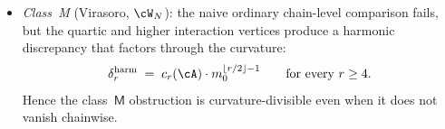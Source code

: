 \begin{proposition}
\begin{enumerate}[label=\textup{(\arabic*)},nosep]
\begin{itemize}[nosep]
 \textup{(}$\beta\gamma$\textup{)}:
 conditional on harmonic decoupling.
 Although the quartic interaction vertex is nonzero
 \textup{(}shadow depth $r_{\max} = 4$\textup{)},
 the harmonic-propagator correction vanishes once the
 harmonic term factors through the composite free-field sector
 by the three-mechanism argument
 \textup{(}Remark~\textup{\ref{rem:bv-bar-class-c-proof}}\textup{)}.
 \item \emph{Class~M}
 \textup{(}Virasoro, $\cW_N$\textup{)}:
 the naive ordinary chain-level comparison fails, but the
 quartic and higher interaction vertices produce a harmonic
 discrepancy that factors through the curvature:
 \[
 \delta_r^{\mathrm{harm}}
 \;=\;
 c_r(\cA)\cdot m_0^{\lfloor r/2 \rfloor - 1}
 \qquad\text{for every } r \geq 4.
 \]
 Hence the class~$\mathsf{M}$ obstruction is curvature-divisible
 even when it does not vanish chainwise.
 \end{itemize}
\end{enumerate}
\end{proposition}

